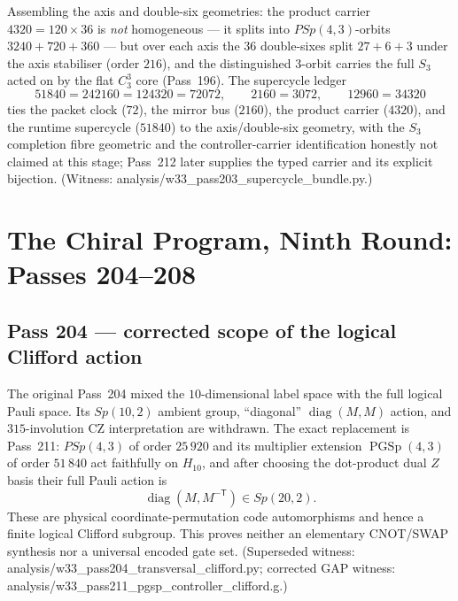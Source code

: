 \documentclass[12pt,a4paper]{article}
\def\mathrm#1{#1}%
\def\texttt#1{#1}%
\def\cdot{ }%
\theoremstyle{definition}
\newcommand{\Sp}{\mathrm{Sp}}
\newcommand{\PSp}{\mathrm{PSp}}
\begin{document}
Assembling the axis and double-six geometries: the product carrier
$4320=120\times36$ is \emph{not} homogeneous --- it splits into
$\PSp(4,3)$-orbits $3240+720+360$ --- but over each axis the $36$
double-sixes split $27+6+3$ under the axis stabiliser (order $216$), and
the distinguished $3$-orbit carries the full $S_3$ acted on by the flat
$C_3^3$ core (Pass~196). The supercycle ledger
\[
  51840=24\cdot2160=12\cdot4320=720\cdot72,\qquad
  2160=30\cdot72,\qquad 12960=3\cdot4320
\]
ties the packet clock ($72$), the mirror bus ($2160$), the product carrier
($4320$), and the runtime supercycle ($51840$) to the axis/double-six
geometry, with the $S_3$ completion fibre geometric and the
controller-carrier identification honestly not claimed at this stage;
Pass~212 later supplies the typed carrier and its explicit bijection.
(Witness:
\texttt{analysis/w33\_pass203\_supercycle\_bundle.py}.)

\section{The Chiral Program, Ninth Round: Passes 204--208}
\label{sec:chiral-program-nine}

\subsection{Pass 204 --- corrected scope of the logical Clifford action}
\label{ssec:pass204}

The original Pass~204 mixed the $10$-dimensional label space with the full
logical Pauli space.  Its $\Sp(10,2)$ ambient group, ``diagonal''
$\operatorname{diag}(M,M)$ action, and $315$-involution CZ interpretation
are withdrawn.  The exact replacement is Pass~211: $\PSp(4,3)$ of order
$25\,920$ and its multiplier extension $\operatorname{PGSp}(4,3)$ of order
$51\,840$ act faithfully on $H_{10}$, and after choosing the dot-product
dual $Z$ basis their full Pauli action is
\[
  \boxed{\operatorname{diag}(M,M^{-\mathsf T})\in\Sp(20,2).}
\]
These are physical coordinate-permutation code automorphisms and hence a
finite logical Clifford subgroup.  This proves neither an elementary
CNOT/SWAP synthesis nor a universal encoded gate set. (Superseded witness:
\texttt{analysis/w33\_pass204\_transversal\_clifford.py}; corrected GAP
witness: \texttt{analysis/w33\_pass211\_pgsp\_controller\_clifford.g}.)
\end{document}

